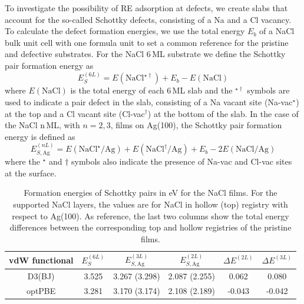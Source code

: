 {To investigate the possibility of RE adsorption at defects,
we create slabs that account for the so-called  Schottky defects,
consisting of a Na and a Cl vacancy. To calculate the defect formation energies,
we use the total energy $E_b$ of a NaCl bulk unit cell with one formula unit
to set a common reference for the pristine and defective substrates.
For the NaCl 6\,ML substrate we define the Schottky pair formation energy as
\begin{equation}
E_S^{(6L)} = E(\mathrm{NaCl}^{\star\dagger}) + E_b - E(\mathrm{NaCl})
\label{eq:ES_6l}
\end{equation}
where $E(\mathrm{NaCl})$ is the total energy of each 6\,ML slab and the $^{\star\dagger}$ symbols are used to
indicate a pair defect in the slab, consisting of a Na vacant site (Na-vac$^{\star}$) at the top and
a Cl vacant site (Cl-vac$^{\dagger}$) at the bottom of the slab.
In the case of the NaCl n\,ML, with $n=2,3$, films on Ag(100), the Schottky pair formation energy is defined as
\begin{equation}
E_{S,\mathrm{Ag}}^{(nL)} = E(\mathrm{NaCl}^\star\mathrm{/Ag}) + E(\mathrm{NaCl}^\dagger\mathrm{/Ag}) +
E_b - 2 E(\mathrm{NaCl/Ag})
\label{eq:ES_ag2l}
\end{equation}
where the $^\star$ and $\dagger$ symbols also indicate the presence of Na-vac and Cl-vac sites at
the surface.

\begin{table}[btp]
\caption{Formation energies of Schottky pairs in eV for the NaCl films. For the supported NaCl layers, the  values are for NaCl in hollow (top) registry with respect to Ag(100). As reference, the last two columns show the total energy differences between the corresponding top and hollow registries of the pristine films.}
\renewcommand{\arraystretch}{1.8}
\begin{ruledtabular}
 \begin{tabular}{c  c  c  c  c  c}
   vdW functional  &  $E_S^{(6L)}$ &  $E_{S,\mathrm{Ag}}^{(3L)}$  & $E_{S,\mathrm{Ag}}^{(2L)}$ &  $\Delta E^{(2L)}$  & $\Delta E^{(3L)}$\\
\hline
D3(BJ) & 3.525 & 3.267 (3.298) & 2.087 (2.255) &  0.062 &  0.080 \\
optPBE & 3.281 & 3.170 (3.174) & 2.108 (2.189) & -0.043 & -0.042 \\
 \end{tabular}
\end{ruledtabular}
\label{tab:ES}
\end{table}


}
